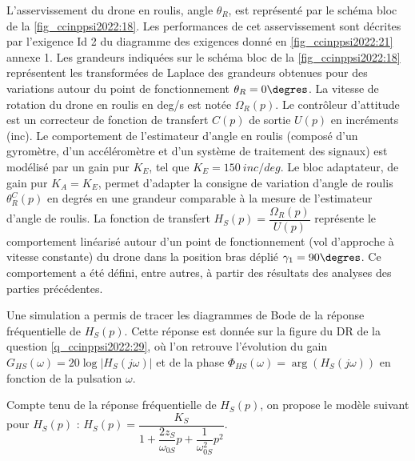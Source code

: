 L’asservissement du drone en roulis, angle $\theta_R$, est représenté par le schéma bloc de la
\autoref{fig_ccinppsi2022:18}. Les performances de cet asservissement sont décrites par l’exigence Id 2 du
diagramme des exigences donné en \autoref{fig_ccinppsi2022:21} annexe 1. Les grandeurs indiquées sur le
schéma bloc de la \autoref{fig_ccinppsi2022:18} représentent les transformées de Laplace des grandeurs obtenues pour des variations autour du point de fonctionnement $\theta_R = 0\degres$. La vitesse de rotation du
drone en roulis en \si{deg/s} est notée $\Omega_R(p)$. Le contrôleur d’attitude est un correcteur de fonction de transfert $C(p)$ de sortie $U(p)$ en incréments (inc). Le comportement de l’estimateur
d’angle en roulis (composé d’un gyromètre, d’un accéléromètre et d’un système de traitement des signaux) est modélisé par un gain pur $K_E$, tel que $K_E = \SI{150}{inc/deg}$.
Le bloc adaptateur, de gain pur $K_A = K_E$, permet d’adapter la consigne de variation d’angle
de roulis $\theta_R^C(p)$ en degrés en une grandeur comparable à la mesure de l’estimateur d’angle
de roulis.
La fonction de transfert $H_S (p) = \dfrac{\Omega_R(p)}{U(p)}$ représente le comportement linéarisé autour d’un
point de fonctionnement (vol d’approche à vitesse constante) du drone dans la position bras
déplié $\gamma_1 = 90\degres$. Ce comportement a été défini, entre autres, à partir des résultats des analyses des parties précédentes.


Une simulation a permis de tracer les diagrammes de Bode de la réponse fréquentielle de
$H_S (p)$. Cette réponse est donnée sur la figure du DR de la question \ref{q_ccinppsi2022:29}, où l’on retrouve l’évolution du
gain $G_{HS}(\omega) = 20 \log |H_S (j\omega)|$ et de la phase $\Phi_{HS} (\omega) = \arg\left(H_S (j\omega)\right)$ en fonction de la pulsation $\omega$.

Compte tenu de la réponse fréquentielle de $H_S (p)$, on propose le modèle suivant pour $H_S (p)$ :
$H_S(p)=\dfrac{K_S}{1+\dfrac{2z_S}{\omega_{0S}}p+\dfrac{1}{\omega_{0S}^2}p^2}$.


